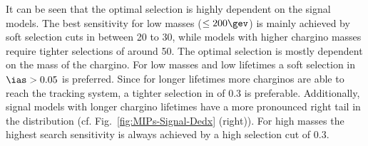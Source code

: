 It can be seen that the optimal selection is highly dependent on the signal models.
The best sensitivity for low masses ($\leq 200\gev$) is mainly achieved by soft selection cuts in \pt between 20 to 30\gev, while models with higher chargino masses require tighter \pt selections of around 50\gev.
The optimal \ias selection is mostly dependent on the mass of the chargino.
For low masses and low lifetimes a soft selection in $\ias>0.05$ is preferred. 
Since for longer lifetimes more charginos are able to reach the tracking system, a tighter selection in \ias of 0.3 is preferable.
Additionally, signal models with longer chargino lifetimes have a more pronounced right tail in the \ias distribution (cf. Fig.~\ref{fig:MIPs-Signal-Dedx} (right)).
For high masses the highest search sensitivity is always achieved by a high \ias selection cut of 0.3.\\

